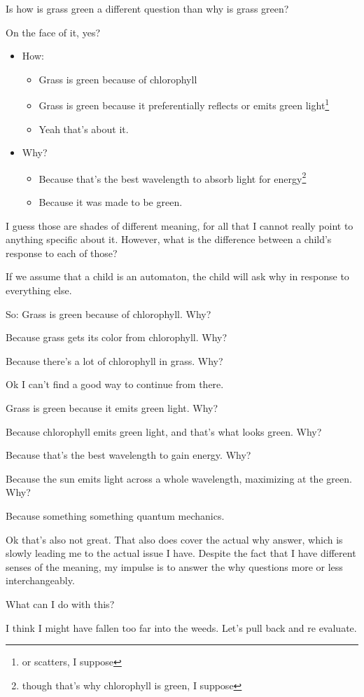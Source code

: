 \documentclass[12pt]{article}[titlepage]
\renewcommand{\,}{\textsuperscript{,}}
\begin{document}
Is how is grass green a different question than why is grass green?

On the face of it, yes?

\begin{itemize}
\item How:
\begin{itemize}
\item Grass is green because of chlorophyll
\item Grass is green because it preferentially reflects or emits green light\footnote{or scatters, I suppose}
\item Yeah that's about it.
\end{itemize}
\item Why?
\begin{itemize}
\item Because that's the best wavelength to absorb light for energy\footnote{though that's why chlorophyll is green, I suppose}
\item Because it was made to be green.
\end{itemize}
\end{itemize}

I guess those are shades of different meaning, for all that I cannot really point to anything specific about it.
However, what is the difference between a child's response to each of those?

If we assume that a child is an automaton, the child will ask why in response to everything else.

So:
Grass is green because of chlorophyll. Why?

Because grass gets its color from chlorophyll.
Why?

Because there's a lot of chlorophyll in grass.
Why?

Ok I can't find a good way to continue from there.

Grass is green because it emits green light.
Why?

Because chlorophyll emits green light, and that's what looks green.
Why?

Because that's the best wavelength to gain energy.
Why?

Because the sun emits light across a whole wavelength, maximizing at the green.
Why?

Because something something quantum mechanics.

Ok that's also not great.
That also does cover the actual why answer, which is slowly leading me to the actual issue I have.
Despite the fact that I have different senses of the meaning, my impulse is to answer the why questions more or less interchangeably.

What can I do with this? 

I think I might have fallen too far into the weeds.
Let's pull back and re evaluate.
\end{document}
